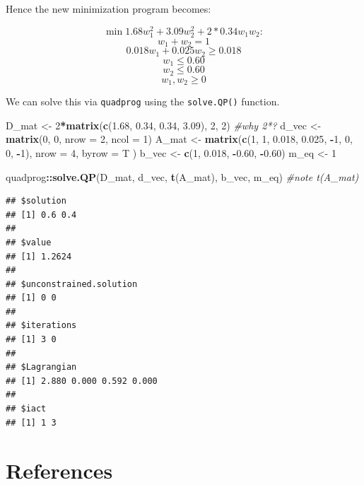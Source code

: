 \documentclass[11pt,]{article}
\newenvironment{Shaded}{\begin{snugshade}}{\end{snugshade}}
\newcommand{\KeywordTok}[1]{\textcolor[rgb]{0.13,0.29,0.53}{\textbf{#1}}}
\newcommand{\DataTypeTok}[1]{\textcolor[rgb]{0.13,0.29,0.53}{#1}}
\newcommand{\DecValTok}[1]{\textcolor[rgb]{0.00,0.00,0.81}{#1}}
\newcommand{\FloatTok}[1]{\textcolor[rgb]{0.00,0.00,0.81}{#1}}
\newcommand{\StringTok}[1]{\textcolor[rgb]{0.31,0.60,0.02}{#1}}
\newcommand{\CommentTok}[1]{\textcolor[rgb]{0.56,0.35,0.01}{\textit{#1}}}
\newcommand{\OperatorTok}[1]{\textcolor[rgb]{0.81,0.36,0.00}{\textbf{#1}}}
\newcommand{\NormalTok}[1]{#1}
\begin{document}
Hence the new minimization program becomes:

\[\min{} 1.68w_1^2+3.09w_2^2+2*0.34w_1w_2:\] \[w_1+w_2=1\]
\[0.018w_1 + 0.025w_2 \geq 0.018\] \[w_1\leq 0.60\] \[w_2\leq 0.60\]
\[w_1, w_2\geq 0\]

We can solve this via \texttt{quadprog} using the \texttt{solve.QP()}
function.

\begin{Shaded}
\begin{Highlighting}[]
\NormalTok{D_mat <-}\StringTok{ }\DecValTok{2}\OperatorTok{*}\KeywordTok{matrix}\NormalTok{(}\KeywordTok{c}\NormalTok{(}\FloatTok{1.68}\NormalTok{, }\FloatTok{0.34}\NormalTok{, }\FloatTok{0.34}\NormalTok{, }\FloatTok{3.09}\NormalTok{), }\DecValTok{2}\NormalTok{, }\DecValTok{2}\NormalTok{) }\CommentTok{#why 2*?}
\NormalTok{d_vec <-}\StringTok{ }\KeywordTok{matrix}\NormalTok{(}\DecValTok{0}\NormalTok{, }\DecValTok{0}\NormalTok{, }\DataTypeTok{nrow =} \DecValTok{2}\NormalTok{, }\DataTypeTok{ncol =} \DecValTok{1}\NormalTok{)}
\NormalTok{A_mat <-}\StringTok{ }\KeywordTok{matrix}\NormalTok{(}\KeywordTok{c}\NormalTok{(}\DecValTok{1}\NormalTok{, }\DecValTok{1}\NormalTok{, }\FloatTok{0.018}\NormalTok{, }\FloatTok{0.025}\NormalTok{, }\OperatorTok{-}\DecValTok{1}\NormalTok{, }\DecValTok{0}\NormalTok{, }\DecValTok{0}\NormalTok{, }\OperatorTok{-}\DecValTok{1}\NormalTok{), }
                \DataTypeTok{nrow =} \DecValTok{4}\NormalTok{, }
                \DataTypeTok{byrow =}\NormalTok{ T}
\NormalTok{                )}
\NormalTok{b_vec <-}\StringTok{ }\KeywordTok{c}\NormalTok{(}\DecValTok{1}\NormalTok{, }\FloatTok{0.018}\NormalTok{, }\OperatorTok{-}\FloatTok{0.60}\NormalTok{, }\OperatorTok{-}\FloatTok{0.60}\NormalTok{)}
\NormalTok{m_eq <-}\StringTok{ }\DecValTok{1}

\NormalTok{quadprog}\OperatorTok{::}\KeywordTok{solve.QP}\NormalTok{(D_mat, d_vec, }\KeywordTok{t}\NormalTok{(A_mat), b_vec, m_eq) }\CommentTok{#note t(A_mat)}
\end{Highlighting}
\end{Shaded}

\begin{verbatim}
## $solution
## [1] 0.6 0.4
## 
## $value
## [1] 1.2624
## 
## $unconstrained.solution
## [1] 0 0
## 
## $iterations
## [1] 3 0
## 
## $Lagrangian
## [1] 2.880 0.000 0.592 0.000
## 
## $iact
## [1] 1 3
\end{verbatim}

\section*{References}\label{references}
\end{document}
